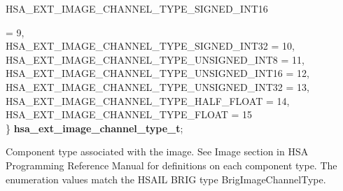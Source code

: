 \documentclass[final,oneside]{book}
\newcommand{\reftyp}[1]{#1}
\newcommand{\refenu}[1]{\reftyp{#1}}
\newenvironment{mylongtable}{\rowcolors{0}{lightgray}{lightgray}\longtable} {
\endlongtable}
\begin{document}
\begin{mylongtable}{@{}p{\textwidth}}
\hspace{1.7em}\hypertarget{group__ext-images_1ggaa143aa6feeaf24103b886c571ace568fa94b5591edcfac1939f541c48a6f84400}{\refenu{HSA_\-EXT_\-IMAGE_\-CHANNEL_\-TYPE_\-SIGNED_\-INT16}} = 9,\\
\hspace{1.7em}\hypertarget{group__ext-images_1ggaa143aa6feeaf24103b886c571ace568fab58308c224a7d513ecbf0ffd51846ff2}{\refenu{HSA_\-EXT_\-IMAGE_\-CHANNEL_\-TYPE_\-SIGNED_\-INT32}} = 10,\\
\hspace{1.7em}\hypertarget{group__ext-images_1ggaa143aa6feeaf24103b886c571ace568fad5a41c0a19a7cb34f4343db6cf757b7a}{\refenu{HSA_\-EXT_\-IMAGE_\-CHANNEL_\-TYPE_\-UNSIGNED_\-INT8}} = 11,\\
\hspace{1.7em}\hypertarget{group__ext-images_1ggaa143aa6feeaf24103b886c571ace568fa1779271b7ca06132b05918e5a72a2a85}{\refenu{HSA_\-EXT_\-IMAGE_\-CHANNEL_\-TYPE_\-UNSIGNED_\-INT16}} = 12,\\
\hspace{1.7em}\hypertarget{group__ext-images_1ggaa143aa6feeaf24103b886c571ace568faf925e28a04ef0162badd74c43b324ec5}{\refenu{HSA_\-EXT_\-IMAGE_\-CHANNEL_\-TYPE_\-UNSIGNED_\-INT32}} = 13,\\
\hspace{1.7em}\hypertarget{group__ext-images_1ggaa143aa6feeaf24103b886c571ace568fa71200bfc55d6373e117594a624472973}{\refenu{HSA_\-EXT_\-IMAGE_\-CHANNEL_\-TYPE_\-HALF_\-FLOAT}} = 14,\\
\hspace{1.7em}\hypertarget{group__ext-images_1ggaa143aa6feeaf24103b886c571ace568fa4b06498e72cfae3bffd55e5c7a483576}{\refenu{HSA_\-EXT_\-IMAGE_\-CHANNEL_\-TYPE_\-FLOAT}} = 15\\
\} \hypertarget{group__ext-images_1gaa143aa6feeaf24103b886c571ace568f}{\textbf{hsa_\-ext_\-image_\-channel_\-type_\-t}};\rule[-2ex]{0pt}{0pt}\end{mylongtable}
\vspace{-5mm}Component type associated with the image. See Image section in HSA Programming Reference Manual for definitions on each component type. The enumeration values match the HSAIL BRIG type BrigImageChannelType.
\end{document}
